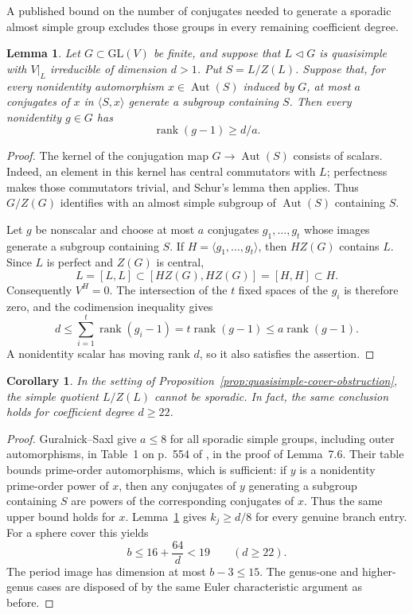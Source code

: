 \documentclass[11pt]{article}
\newtheorem{lemma}[theorem]{Lemma}
\newtheorem{corollary}[theorem]{Corollary}
\theoremstyle{definition}
\theoremstyle{remark}
\begin{document}
A published bound on the number of conjugates needed to generate a
sporadic almost simple group excludes those groups in every remaining
coefficient degree.

\begin{lemma}\label{lem:conjugate-generation-support}
Let $G\subset\mathrm{GL}(V)$ be finite, and suppose that
$L\triangleleft G$ is quasisimple with $V|_L$ irreducible of dimension
$d>1$.  Put $S=L/Z(L)$.  Suppose that, for every nonidentity automorphism
$x\in\operatorname{Aut}(S)$ induced by $G$, at most $a$ conjugates of $x$
in $\langle S,x\rangle$ generate a subgroup containing $S$.
Then every nonidentity $g\in G$ has
\[
 \operatorname{rank}(g-1)\ge d/a.
\]
\end{lemma}

\begin{proof}
The kernel of the conjugation map $G\longrightarrow\operatorname{Aut}(S)$
consists of scalars.  Indeed, an element in this kernel has central
commutators with $L$; perfectness makes those commutators trivial, and
Schur's lemma then applies.  Thus $G/Z(G)$ identifies with an almost
simple subgroup of $\operatorname{Aut}(S)$ containing $S$.

Let $g$ be nonscalar and choose at most $a$ conjugates $g_1,\ldots,g_t$
whose images generate a subgroup containing $S$.  If
$H=\langle g_1,\ldots,g_t\rangle$, then $HZ(G)$ contains $L$.
Since $L$ is perfect and $Z(G)$ is central,
\[
 L=[L,L]\subset[HZ(G),HZ(G)]=[H,H]\subset H.
\]
Consequently $V^H=0$.  The intersection of the $t$ fixed spaces of the
$g_i$ is therefore zero, and the codimension inequality gives
\[
 d\le\sum_{i=1}^t\operatorname{rank}(g_i-1)
   =t\operatorname{rank}(g-1)\le a\operatorname{rank}(g-1).
\]
A nonidentity scalar has moving rank $d$, so it also satisfies the
assertion.
\end{proof}

\begin{corollary}\label{cor:sporadic-cover-obstruction}
In the setting of Proposition~\ref{prop:quasisimple-cover-obstruction},
the simple quotient $L/Z(L)$ cannot be sporadic.  In fact, the same
conclusion holds for coefficient degree $d\ge22$.
\end{corollary}

\begin{proof}
Guralnick--Saxl give $a\le8$ for all sporadic simple groups, including
outer automorphisms, in Table~1 on p.~554 of \cite{GS}, in the proof of
Lemma~7.6.  Their table bounds prime-order automorphisms, which is
sufficient: if $y$ is a nonidentity prime-order power of $x$, then any
conjugates of $y$ generating a subgroup containing $S$ are powers of
the corresponding conjugates of $x$.  Thus the same upper bound holds
for $x$.
Lemma~\ref{lem:conjugate-generation-support} gives $k_j\ge d/8$ for
every genuine branch entry.  For a sphere cover this yields
\[
 b\le16+\frac{64}{d}<19\qquad(d\ge22).
\]
The period image has dimension at most $b-3\le15$.  The genus-one
and higher-genus cases are disposed of by the same Euler characteristic
argument as before.
\end{proof}
\end{document}
